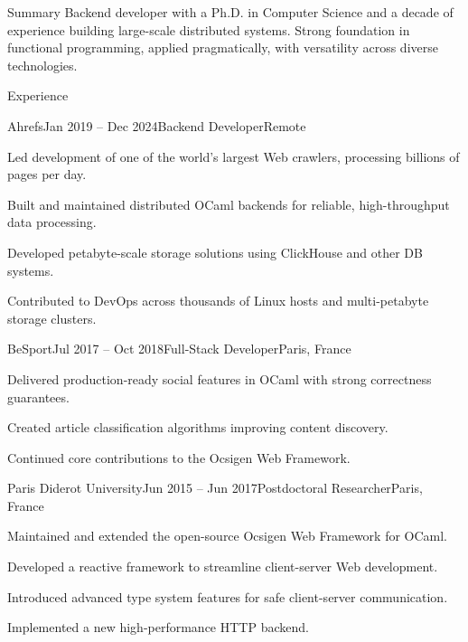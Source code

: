 \documentclass[11pt]{resume}
\begin{document}
\begin{rSection}{Summary}
Backend developer with a Ph.D. in Computer Science and a decade of
experience building large-scale distributed systems. Strong foundation
in functional programming, applied pragmatically, with versatility
across diverse technologies.
\end{rSection}

\begin{rSection}{Experience}

  \begin{rSubsection}{Ahrefs}{Jan 2019 -- Dec 2024}{Backend
      Developer}{Remote}
  \item Led development of one of the world’s largest Web crawlers,
    processing billions of pages per day.
  \item Built and maintained distributed OCaml backends for reliable,
    high-throughput data processing.
  \item Developed petabyte-scale storage solutions using ClickHouse
    and other DB systems.
  \item Contributed to DevOps across thousands of Linux hosts and
    multi-petabyte storage clusters.
  \end{rSubsection}

  \begin{rSubsection}{BeSport}{Jul 2017 -- Oct 2018}{Full-Stack
      Developer}{Paris, France}
  \item Delivered production-ready social features in OCaml with
    strong correctness guarantees.
  \item Created article classification algorithms improving content
    discovery.
  \item Continued core contributions to the Ocsigen Web Framework.
  \end{rSubsection}

  \begin{rSubsection}{Paris Diderot University}{Jun 2015 -- Jun
      2017}{Postdoctoral Researcher}{Paris, France}
  \item Maintained and extended the open-source Ocsigen Web Framework
    for OCaml.
  \item Developed a reactive framework to streamline client-server Web
    development.
  \item Introduced advanced type system features for safe
    client-server communication.
  \item Implemented a new high-performance HTTP backend.
  \end{rSubsection}

\end{rSection}
\end{document}
